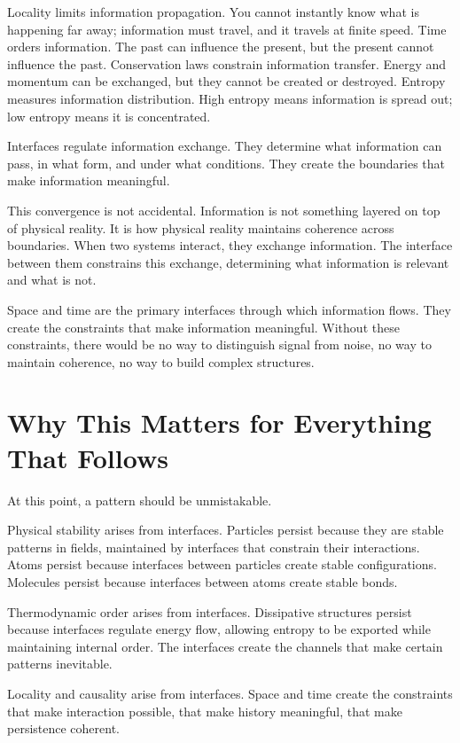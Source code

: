 \documentclass[
  openright]{book}
\begin{document}
Locality limits information propagation. You cannot instantly know what
is happening far away; information must travel, and it travels at finite
speed. Time orders information. The past can influence the present, but
the present cannot influence the past. Conservation laws constrain
information transfer. Energy and momentum can be exchanged, but they
cannot be created or destroyed. Entropy measures information
distribution. High entropy means information is spread out; low entropy
means it is concentrated.

Interfaces regulate information exchange. They determine what
information can pass, in what form, and under what conditions. They
create the boundaries that make information meaningful.

This convergence is not accidental. Information is not something layered
on top of physical reality. It is how physical reality maintains
coherence across boundaries. When two systems interact, they exchange
information. The interface between them constrains this exchange,
determining what information is relevant and what is not.

Space and time are the primary interfaces through which information
flows. They create the constraints that make information meaningful.
Without these constraints, there would be no way to distinguish signal
from noise, no way to maintain coherence, no way to build complex
structures.

\section{Why This Matters for Everything That
Follows}\label{why-this-matters-for-everything-that-follows}

At this point, a pattern should be unmistakable.

Physical stability arises from interfaces. Particles persist because
they are stable patterns in fields, maintained by interfaces that
constrain their interactions. Atoms persist because interfaces between
particles create stable configurations. Molecules persist because
interfaces between atoms create stable bonds.

Thermodynamic order arises from interfaces. Dissipative structures
persist because interfaces regulate energy flow, allowing entropy to be
exported while maintaining internal order. The interfaces create the
channels that make certain patterns inevitable.

Locality and causality arise from interfaces. Space and time create the
constraints that make interaction possible, that make history
meaningful, that make persistence coherent.
\end{document}
